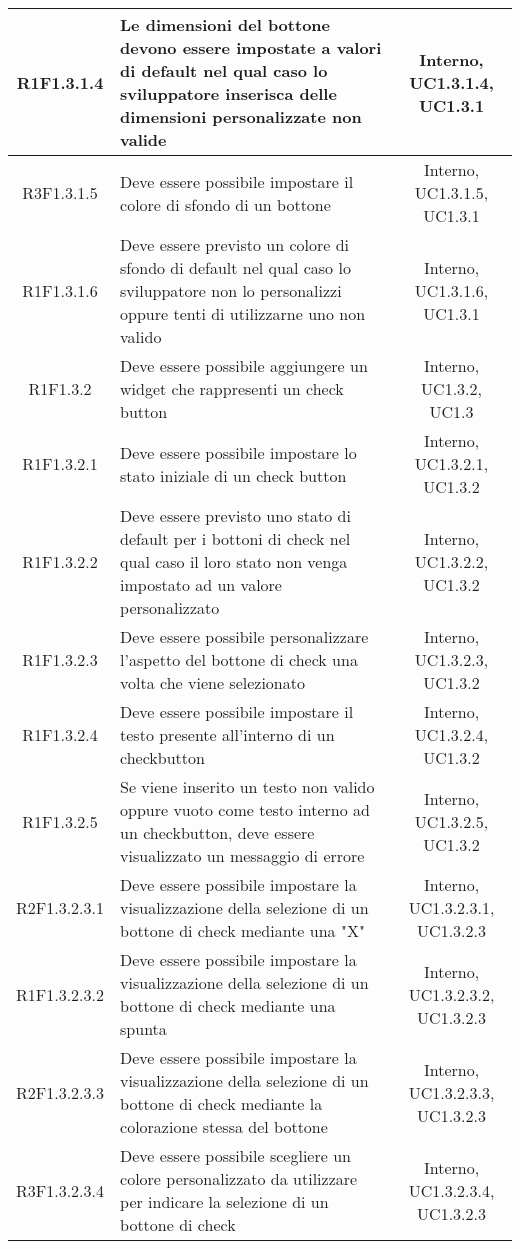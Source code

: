 \begin{longtable}{|c|>{\centering}m{7cm}|c|}
			\hline
			R1F1.3.1.4 & Le dimensioni del bottone devono essere impostate a valori di default nel qual caso lo sviluppatore inserisca delle dimensioni personalizzate non valide & Interno, UC1.3.1.4, UC1.3.1 \\
			\hline
			R3F1.3.1.5 & Deve essere possibile impostare il colore di sfondo di un bottone & Interno, UC1.3.1.5, UC1.3.1 \\
			\hline
			R1F1.3.1.6 & Deve essere previsto un colore di sfondo di default nel qual caso lo sviluppatore non lo personalizzi oppure tenti di utilizzarne uno non valido & Interno, UC1.3.1.6, UC1.3.1 \\
			\hline
			R1F1.3.2 & Deve essere possibile aggiungere un widget che rappresenti un check button & Interno, UC1.3.2, UC1.3 \\
			\hline
			R1F1.3.2.1 & Deve essere possibile impostare lo stato iniziale di un check button & Interno, UC1.3.2.1, UC1.3.2 \\
		\hline
		R1F1.3.2.2 & Deve essere previsto uno stato di default per i bottoni di check nel qual caso il loro stato non venga impostato ad un valore personalizzato & Interno, UC1.3.2.2, UC1.3.2 \\
		\hline
		R1F1.3.2.3 & Deve essere possibile personalizzare l'aspetto del bottone di check una volta che viene selezionato & Interno, UC1.3.2.3, UC1.3.2 \\
		R1F1.3.2.4 & Deve essere possibile impostare il testo presente all'interno di un checkbutton & Interno, UC1.3.2.4, UC1.3.2 \\
		\hline
		R1F1.3.2.5 & Se viene inserito un testo non valido oppure vuoto come testo interno ad un checkbutton, deve essere visualizzato un messaggio di errore & Interno, UC1.3.2.5, UC1.3.2 \\
		\hline
		R2F1.3.2.3.1 & Deve essere possibile impostare la visualizzazione della selezione di un bottone di check mediante una "X" & Interno, UC1.3.2.3.1, UC1.3.2.3 \\ 
		\hline
		R1F1.3.2.3.2 & Deve essere possibile impostare la visualizzazione della selezione di un bottone di check mediante una spunta & Interno, UC1.3.2.3.2, UC1.3.2.3 \\ 
		\hline
		R2F1.3.2.3.3 & Deve essere possibile impostare la visualizzazione della selezione di un bottone di check mediante la colorazione stessa del bottone & Interno, UC1.3.2.3.3, UC1.3.2.3 \\ 
		\hline
		R3F1.3.2.3.4 & Deve essere possibile scegliere un colore personalizzato da utilizzare per indicare la selezione di un bottone di check & Interno, UC1.3.2.3.4, UC1.3.2.3 \\ 

\end{longtable}
